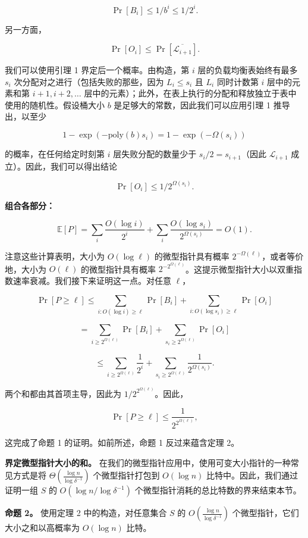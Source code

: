\documentclass[12pt,a4paper]{ctexart}
\theoremstyle{remark}
\begin{document}
$$\Pr[B_i]\leq 1/b^i\leq 1/2^i.$$

另一方面，

$$\Pr[O_i]\leq\Pr[\overline{\mathcal{L}_{i+1}}].$$

我们可以使用引理 1 界定后一个概率。由构造，第 $i$ 层的负载均衡表始终有最多 $s_i$ 次分配对之进行（包括失败的那些，因为 $L_i\leq s_i$ 且 $L_i$ 同时计数第 $i$ 层中的元素和第 $i+1,i+2,\ldots$ 层中的元素）；此外，在表上执行的分配和释放独立于表中使用的随机性。假设桶大小 $b$ 是足够大的常数，因此我们可以应用引理 1 推导出，以至少

$$1-\exp(-\text{poly}(b)s_i)=1-\exp(-\Omega(s_i))$$

的概率，在任何给定时刻第 $i$ 层失败分配的数量少于 $s_i/2=s_{i+1}$（因此 $\mathcal{L}_{i+1}$ 成立）。因此，我们可以得出结论

$$\Pr[O_i]\leq 1/2^{\Omega(s_i)}.$$

\textbf{组合各部分：}

$$\mathbb{E}[P]=\sum_i\frac{O(\log i)}{2^i}+\sum_i\frac{O(\log s_i)}{2^{\Omega(s_i)}}=O(1).$$

注意这些计算表明，大小为 $O(\log\ell)$ 的微型指针具有概率 $2^{-\Omega(\ell)}$，或者等价地，大小为 $O(\ell)$ 的微型指针具有概率 $2^{-2^{\Omega(\ell)}}$。这提示微型指针大小以双重指数速率衰减。我们接下来证明这一点。对任意 $\ell$，

$$\Pr[P\geq\ell]\leq\sum_{i:O(\log i)\geq\ell}\Pr[B_i]+\sum_{i:O(\log s_i)\geq\ell}\Pr[O_i]$$

$$=\sum_{i\geq 2^{\Omega(\ell)}}\Pr[B_i]+\sum_{s_i\geq 2^{\Omega(\ell)}}\Pr[O_i]$$

$$\leq\sum_{i\geq 2^{\Omega(\ell)}}\frac{1}{2^i}+\sum_{s_i\geq 2^{\Omega(\ell)}}\frac{1}{2^{\Omega(s_i)}}.$$

两个和都由其首项主导，因此为 $1/2^{2^{\Omega(\ell)}}$。因此，

$$\Pr[P\geq\ell]\leq\frac{1}{2^{2^{\Omega(\ell)}}},$$

这完成了命题 1 的证明。如前所述，命题 1 反过来蕴含定理 2。

\textbf{界定微型指针大小的和。} 在我们的微型指针应用中，使用可变大小指针的一种常见方式是将 $\Theta\left(\frac{\log n}{\log\delta^{-1}}\right)$ 个微型指针打包到 $O(\log n)$ 比特中。因此，我们通过证明一组 $S$ 的 $O(\log n/\log\delta^{-1})$ 个微型指针消耗的总比特数的界来结束本节。

\textbf{命题 2。} 使用定理 2 中的构造，对任意集合 $S$ 的 $O\left(\frac{\log n}{\log\delta^{-1}}\right)$ 个微型指针，它们大小之和以高概率为 $O(\log n)$ 比特。
\end{document}
